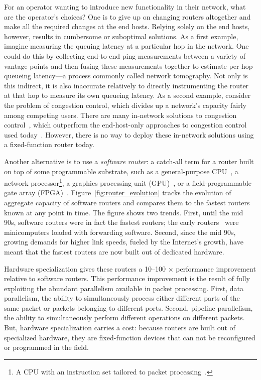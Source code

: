 For an operator wanting to introduce new functionality in their network, what
are the operator's choices? One is to give up on changing routers altogether
and make all the required changes at the end hosts.  Relying solely on the end
hosts, however, results in cumbersome or suboptimal solutions. As a first
example, imagine measuring the queuing latency at a particular hop in the
network. One could do this by collecting end-to-end ping measurements between a
variety of vantage points and then fusing these measurements together to
estimate per-hop queueing latency---a process commonly called network
tomography. Not only is this indirect, it is also inaccurate relatively to
directly instrumenting the router at that hop to measure its own queueing
latency. As a second example, consider the problem of congestion control, which
divides up a network's capacity fairly among competing users. There are many
in-network solutions to congestion control~\cite{xcp, rcp}, which outperform
the end-host-only approaches to congestion control used today~\cite{cubic,
compound}. However, there is no way to deploy these in-network solutions using
a fixed-function router today.

Another alternative is to use a \textit{software router}: a catch-all term for
a router built on top of some programmable substrate, such as a general-purpose
CPU~\cite{click, routebricks}, a network processor\footnote{A CPU with an
instruction set tailored to packet processing~\cite{ixp4xx, ixp2800}.}, a
graphics processing unit (GPU)~\cite{packetshader}, or a field-programmable
gate array (FPGA)~\cite{netfpga}.  Figure~\ref{fig:router_evolution} tracks the
evolution of aggregate capacity of software routers and compares them to the
fastest routers known at any point in time. The figure shows two trends.
First, until the mid 90s, software routers were in fact the fastest routers;
the early routers~\cite{imp} were minicomputers loaded with forwarding
software. Second, since the mid 90s, growing demands for higher link speeds,
fueled by the Internet's growth, have meant that the fastest routers are now
built out of dedicated hardware.

Hardware specialization gives these routers a 10--100 $\times$ performance
improvement relative to software routers.  This performance improvement is the
result of fully exploiting the abundant parallelism available in packet
processing. First, data parallelism, the ability to simultaneously process
either different parts of the same packet or packets belonging to different
ports. Second, pipeline parallelism, the ability to simultaneously perform
different operations on different packets. But, hardware specialization carries
a cost: because routers are built out of specialized hardware, they are
fixed-function devices that can not be reconfigured or programmed in the field.

